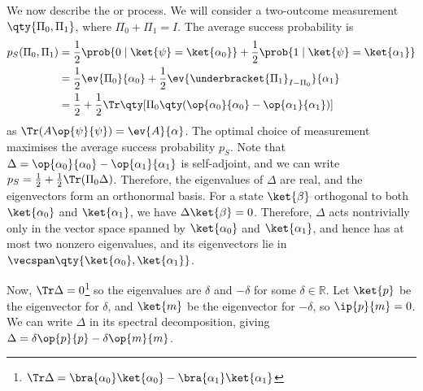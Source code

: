 We now describe the  or  process.
We will consider a two-outcome measurement $\qty{\Pi_0, \Pi_1}$, where $\Pi_0 + \Pi_1 = I$.
The average success probability is
\begin{align*}
    p_S(\Pi_0, \Pi_1) &= \frac{1}{2} \prob{0 \mid \ket{\psi} = \ket{\alpha_0}} + \frac{1}{2} \prob{1 \mid \ket{\psi} = \ket{\alpha_1}} \\
    &= \frac{1}{2}\ev{\Pi_0}{\alpha_0} + \frac{1}{2}\ev{\underbracket{\Pi_1}_{I - \Pi_0}}{\alpha_1} \\
    &= \frac{1}{2} + \frac{1}{2} \Tr \qty[\Pi_0 \qty(\op{\alpha_0}{\alpha_0} - \op{\alpha_1}{\alpha_1})]
\end{align*}
as $\Tr(A\op{\psi}{\psi}) = \ev{A}{\alpha}$.
The optimal choice of measurement maximises the average success probability $p_S$.
Note that $\Delta = \op{\alpha_0}{\alpha_0} - \op{\alpha_1}{\alpha_1}$ is self-adjoint, and we can write $p_S = \frac{1}{2} + \frac{1}{2} \Tr(\Pi_0 \Delta)$.
Therefore, the eigenvalues of $\Delta$ are real, and the eigenvectors form an orthonormal basis.
For a state $\ket{\beta}$ orthogonal to both $\ket{\alpha_0}$ and $\ket{\alpha_1}$, we have $\Delta \ket{\beta} = 0$.
Therefore, $\Delta$ acts nontrivially only in the vector space spanned by $\ket{\alpha_0}$ and $\ket{\alpha_1}$, and hence has at most two nonzero eigenvalues, and its eigenvectors lie in $\vecspan\qty{\ket{\alpha_0}, \ket{\alpha_1}}$.

Now, $\Tr\Delta = 0$\footnote{$\Tr \Delta = \bra{\alpha_0}\ket{\alpha_0} - \bra{\alpha_1}\ket{\alpha_1}$} so the eigenvalues are $\delta$ and $-\delta$ for some $\delta \in \mathbb R$.
Let $\ket{p}$ be the eigenvector for $\delta$, and $\ket{m}$ be the eigenvector for $-\delta$, so $\ip{p}{m} = 0$.
We can write $\Delta$ in its spectral decomposition, giving $\Delta = \delta \op{p}{p} - \delta \op{m}{m}$.

